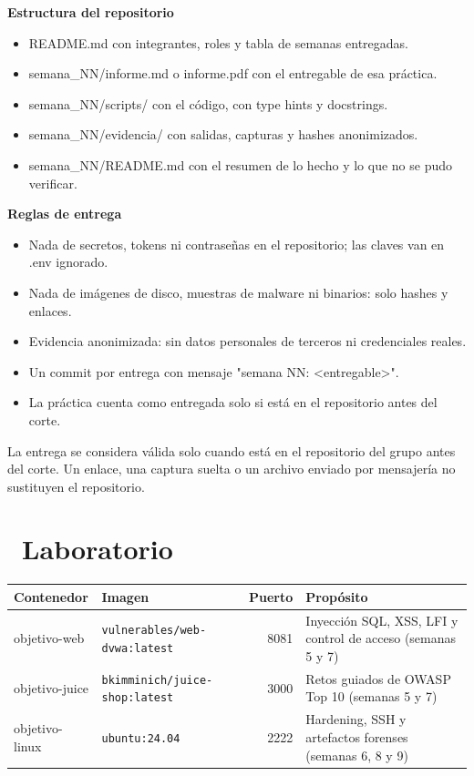 \documentclass[11pt,a4paper]{article}
\newcommand{\iconotexto}[2]{\textcolor{cyanNeon}{\faIcon{#1}}~#2}
\begin{document}
\textbf{Estructura del repositorio}

\begin{itemize}[leftmargin=1.4em,itemsep=2pt,topsep=3pt]
  \item README.md con integrantes, roles y tabla de semanas entregadas.
  \item semana\_NN/informe.md o informe.pdf con el entregable de esa práctica.
  \item semana\_NN/scripts/ con el código, con type hints y docstrings.
  \item semana\_NN/evidencia/ con salidas, capturas y hashes anonimizados.
  \item semana\_NN/README.md con el resumen de lo hecho y lo que no se pudo verificar.
\end{itemize}

\textbf{Reglas de entrega}

\begin{itemize}[leftmargin=1.4em,itemsep=2pt,topsep=3pt]
  \item Nada de secretos, tokens ni contraseñas en el repositorio; las claves van en .env ignorado.
  \item Nada de imágenes de disco, muestras de malware ni binarios: solo hashes y enlaces.
  \item Evidencia anonimizada: sin datos personales de terceros ni credenciales reales.
  \item Un commit por entrega con mensaje "semana NN: \textless{}entregable\textgreater{}".
  \item La práctica cuenta como entregada solo si está en el repositorio antes del corte.
\end{itemize}

\begin{cajaRecuerda}La entrega se considera válida solo cuando está en el repositorio del grupo antes del corte. Un enlace, una captura suelta o un archivo enviado por mensajería no sustituyen el repositorio.\end{cajaRecuerda}

\section{\iconotexto{server}{Laboratorio}}

\begin{tabularx}{\linewidth}{@{}l l r X@{}}
\toprule
Contenedor & Imagen & Puerto & Propósito\\
\midrule
objetivo-web & \texttt{vulnerables/web-dvwa:latest} & 8081 & Inyección SQL, XSS, LFI y control de acceso (semanas 5 y 7) \\
objetivo-juice & \texttt{bkimminich/juice-shop:latest} & 3000 & Retos guiados de OWASP Top 10 (semanas 5 y 7) \\
objetivo-linux & \texttt{ubuntu:24.04} & 2222 & Hardening, SSH y artefactos forenses (semanas 6, 8 y 9) \\
\bottomrule
\end{tabularx}
\end{document}
